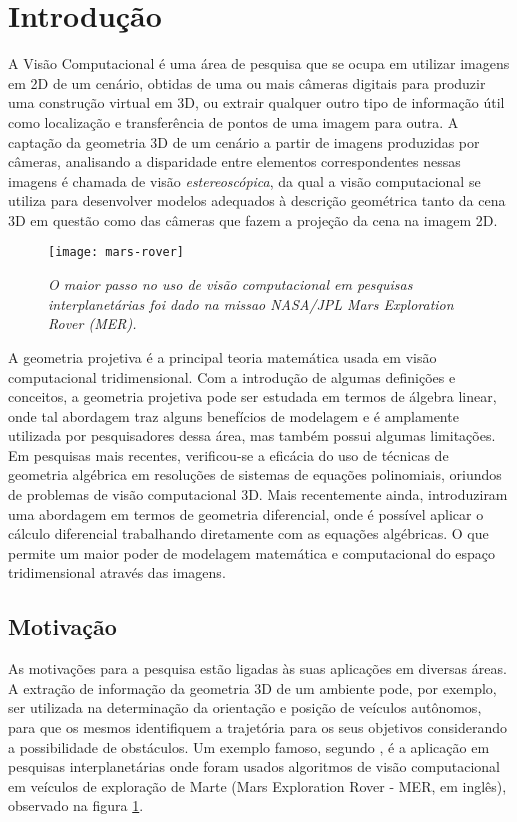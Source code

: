 \pagestyle{headings}
\section{Introdução}
A Visão Computacional é uma área de pesquisa que se ocupa em utilizar imagens em 2D de um cenário, obtidas de uma ou mais câmeras digitais para produzir uma construção virtual em 3D, ou extrair qualquer outro tipo de informação útil como localização e transferência de pontos de uma imagem para outra. A captação da geometria 3D de um cenário a partir de imagens produzidas por câmeras, analisando a disparidade entre elementos correspondentes nessas imagens é chamada de visão {\it estereoscópica}, da qual a visão computacional se utiliza para desenvolver modelos adequados à descrição geométrica tanto da cena 3D em questão como das câmeras que fazem a projeção da cena na imagem 2D.  

\begin{figure}[!htb]
\centering
\texttt{[image: mars-rover]}
\caption{{\it O maior passo no uso de visão computacional em pesquisas interplanetárias foi dado na missao NASA/JPL Mars Exploration Rover (MER).}}
\label{fig.mars-rover}
\end{figure}

A geometria projetiva é a principal teoria matemática usada em visão computacional tridimensional. Com a introdução de algumas definições e conceitos, a geometria projetiva pode ser estudada em termos de álgebra linear, onde tal abordagem traz alguns benefícios de modelagem e é amplamente utilizada por pesquisadores dessa área, mas também possui algumas limitações. Em pesquisas mais recentes, verificou-se a eficácia do uso de técnicas de geometria algébrica em resoluções de sistemas de equações polinomiais, oriundos de problemas de visão computacional 3D. Mais recentemente ainda, \citep{tese-fabbri} introduziram uma abordagem em termos de geometria diferencial, onde é possível aplicar o cálculo diferencial trabalhando diretamente com as equações algébricas. O que permite um maior poder de modelagem matemática e computacional do espaço tridimensional através das imagens.


\subsection*{Motivação}
As motivações para a pesquisa estão ligadas às suas aplicações em diversas áreas. A extração de informação da geometria 3D de um ambiente pode, por exemplo, ser utilizada na determinação da orientação e posição de veículos autônomos, para que os mesmos identifiquem a trajetória para os seus objetivos considerando a possibilidade de obstáculos. Um exemplo famoso, segundo \citep{mars-rover}, é a aplicação em pesquisas interplanetárias onde foram usados algoritmos de visão computacional em veículos de exploração de Marte (Mars Exploration Rover - MER, em inglês), observado na figura \ref{fig.mars-rover}.


